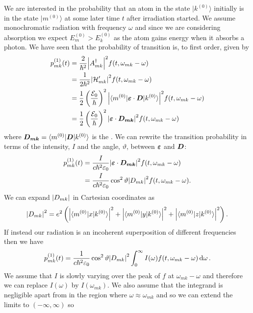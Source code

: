 \documentclass[a4paper]{article}
\renewcommand{\ket}[1]{\vert {#1} \rangle}
\renewcommand{\bra}[1]{\langle {#1} \vert}
\newcommand{\Efield}{\mathcal{E}}
\begin{document}
    We are interested in the probability that an atom in the state \(\ket{k^{(0)}}\) initially is in the state \(\ket{m^{(0)}}\) at some later time \(t\) after irradiation started.
    We assume monochromatic radiation with frequency \(\omega\) and since we are considering absorption we expect \(E_m^{(0)} > E_k^{(0)}\) as the atom gains energy when it absorbs a photon.
    We have seen that the probability of transition is, to first order, given by
    \begin{align*}
        p_{mk}^{(1)}(t) &= \frac{2}{\hbar^2} \abs{A_{mk}\hermit}^2 f(t, \omega_{mk} - \omega)\\
        &= \frac{1}{2\hbar^2}\abs{\mathcal{H}'_{mk}}^2 f(t, \omega_{mk} - \omega)\\
        &= \frac{1}{2}\left( \frac{\Efield_0}{\hbar} \right)^2 \abs{\bra{m^{(0)}} \vv{\varepsilon}\cdot\vv{D}\ket{k^{(0)}}}^2 f(t, \omega_{mk} - \omega)\\
        &= \frac{1}{2}\left( \frac{\Efield_0}{\hbar} \right)^2 \abs{\vv{\varepsilon}\cdot\vv{D_{mk}}}^2f(t, \omega_{mk} - \omega)
    \end{align*}
    where \(\vv{D_{mk}} = \bra{m^{(0)}}\vv{D}\ket{k^{(0)}}\) is the .
    We can rewrite the transition probability in terms of the intensity, \(I\) and the angle, \(\vartheta\), between \(\bm{\varepsilon}\) and \(\bm{D}\):
    \begin{align*}
        p_{mk}^{(1)}(t) &= \frac{I}{c\hbar^2\varepsilon_0} \abs{\bm{\varepsilon} \cdot\bm{D_{mk}}}^2 f(t, \omega_{mk} - \omega)\\
        &= \frac{I}{c\hbar^2\varepsilon_0} \cos^2\vartheta\abs{D_{mk}}^2 f(t, \omega_{mk} - \omega).
    \end{align*}
    We can expand \(\abs{D_{mk}}\) in Cartesian coordinates as
    \[\abs{D_{mk}}^2 = e^2 \left( \abs{\bra{m^{(0)}} x \ket{k^{(0)}}}^2 + \abs{\bra{m^{(0)}} y \ket{k^{(0)}}}^2 + \abs{\bra{m^{(0)}} z \ket{k^{(0)}}}^2 \right).\]
    If instead our radiation is an incoherent superposition of different frequencies then we have
    \[p_{mk}^{(1)}(t) = \frac{1}{c\hbar^2\varepsilon_0} \cos^2\vartheta\abs{D_{mk}}^2 \int_{0}^{\infty} I(\omega)f(t, \omega_{mk} - \omega)\dd{\omega}.\]
    We assume that \(I\) is slowly varying over the peak of \(f\) at \(\omega_{mk} - \omega\) and therefore we can replace \(I(\omega)\) by \(I(\omega_{mk})\).
    We also assume that the integrand is negligible apart from in the region where \(\omega \approx \omega_{mk}\) and so we can extend the limits to \((-\infty, \infty)\) so
\end{document}

